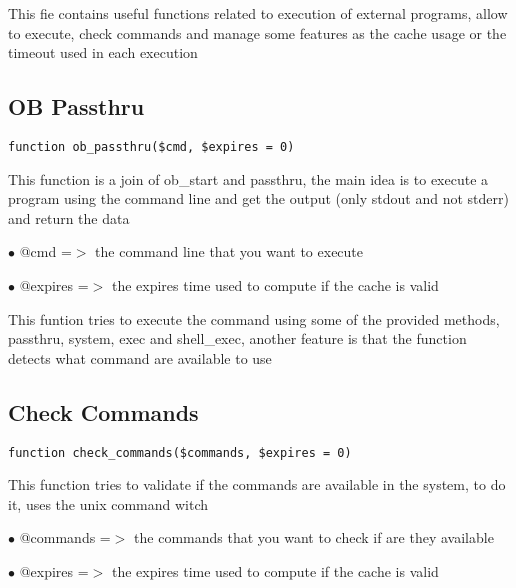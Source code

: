 \documentclass[a4paper]{book}
\begin{document}
This fie contains useful functions related to execution of external programs, allow to execute,
check commands and manage some features as the cache usage or the timeout used in each execution

\hypertarget{toc115}{}
\subsection{OB Passthru}

\begin{lstlisting}
function ob_passthru($cmd, $expires = 0)
\end{lstlisting}

This function is a join of ob\_start and passthru, the main idea
is to execute a program using the command line and get the
output (only stdout and not stderr) and return the data

\begin{compactitem}
\item[\color{myblue}$\bullet$] @cmd     =$>$ the command line that you want to execute
\item[\color{myblue}$\bullet$] @expires =$>$ the expires time used to compute if the cache is valid
\end{compactitem}

This funtion tries to execute the command using some of the
provided methods, passthru, system, exec and shell\_exec, another
feature is that the function detects what command are available
to use

\hypertarget{toc116}{}
\subsection{Check Commands}

\begin{lstlisting}
function check_commands($commands, $expires = 0)
\end{lstlisting}

This function tries to validate if the commands are available
in the system, to do it, uses the unix command witch

\begin{compactitem}
\item[\color{myblue}$\bullet$] @commands =$>$ the commands that you want to check if are they available
\item[\color{myblue}$\bullet$] @expires  =$>$ the expires time used to compute if the cache is valid
\end{compactitem}
\end{document}
